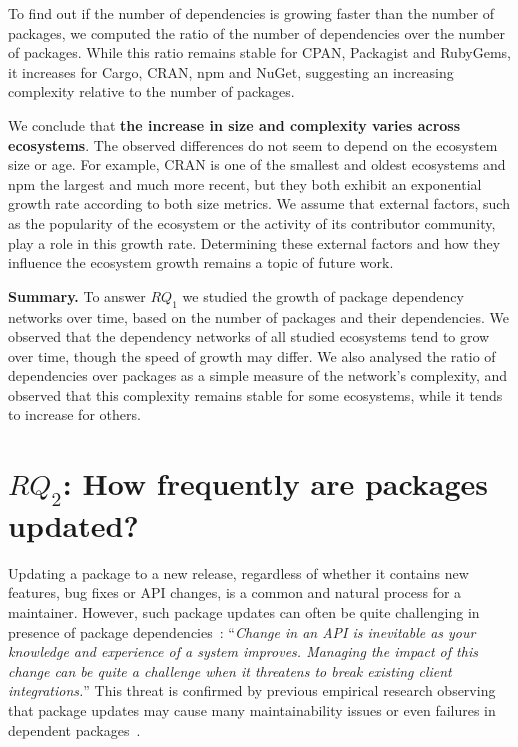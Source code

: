 \documentclass[smallextended]{svjour3}       %
\newcommand{\cran}{\textsf{CRAN}\xspace}
\newcommand{\cpan}{\textsf{CPAN}\xspace}
\newcommand{\rubygems}{\textsf{RubyGems}\xspace}
\newcommand{\packagist}{\textsf{Packagist}\xspace}
\newcommand{\cargo}{\textsf{Cargo}\xspace}
\newcommand{\nuget}{\textsf{NuGet}\xspace}
\newcommand{\npm}{\textsf{npm}\xspace}
\begin{document}
To find out if the number of dependencies is growing faster than the number of packages, we computed the ratio of the number of dependencies over the number of packages. While this ratio remains stable for \cpan, \packagist and \rubygems, it increases for \cargo, \cran, \npm and \nuget, suggesting an increasing complexity relative to the number of packages.

We conclude that \textbf{the increase in size and complexity varies across ecosystems}.
The observed differences do not seem to depend on the ecosystem size or age.
%
For example, \cran is one of the smallest and oldest ecosystems and \npm the largest and much more recent, but they both exhibit an exponential growth rate according to both size metrics.
We assume that external factors, such as the popularity of the ecosystem or the activity of its contributor community, play a role in this growth rate. Determining these external factors and how they influence the ecosystem growth remains a topic of future work.


\begin{mdframed}
\textbf{Summary.} To answer $RQ_1$ we studied the growth of package dependency networks over time, based on the number of packages and their dependencies.
We observed that the dependency networks of all studied ecosystems tend to grow over time, though the speed of growth may differ. We also analysed the ratio of dependencies over packages as a simple measure of the network's complexity, and observed that this complexity remains stable for some ecosystems, while it tends to increase for others.
\end{mdframed}


\section{$RQ_2$: How frequently are packages updated?}
\label{sec:rq-change}

Updating a package to a new release, regardless of whether it contains new features, bug fixes or API changes, is a common and natural process for a maintainer. However, such package updates can often be quite challenging in presence of package dependencies~\cite{BenMorris2016}:
``\textit{Change in an API is inevitable as your knowledge and experience of a system improves. Managing the impact of this change can be quite a challenge when it threatens to break existing client integrations.}''
This threat is confirmed by previous empirical research observing that package updates may cause many maintainability issues or even failures in dependent packages~\cite{DiCosmo2008,Bavota2015,Bogart2016,Decan2017SANER}.
\end{document}
